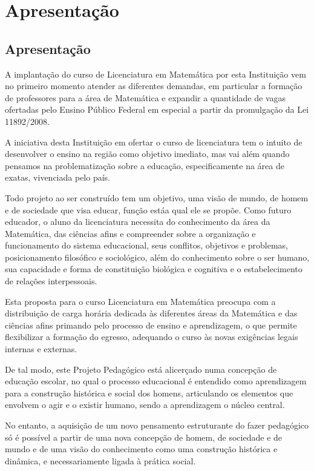 \chapter{Apresenta\c{c}\~{a}o}
\label{cap:apresentacao}

\section{Apresenta\c{c}\~{a}o}
\label{sec:apresentacao}

A implantação do curso de Licenciatura em Matemática por esta
Instituição vem no primeiro momento atender as diferentes demandas, em
particular a formação de professores para a área de Matemática e
expandir a quantidade de vagas ofertadas pelo Ensino Público Federal
em especial a partir da promulgação da Lei 11892/2008.

A iniciativa desta Instituição em ofertar o curso de licenciatura tem
o intuito de desenvolver o ensino na região como objetivo imediato,
mas vai além quando pensamos na problematização sobre a educação,
especificamente na área de exatas, vivenciada pelo país.

Todo projeto ao ser construído tem um objetivo, uma visão de mundo, de
homem e de sociedade que visa educar, função estáa qual ele se propõe.
Como futuro educador, o aluno da licenciatura necessita do
conhecimento da área da Matemática, das ciências afins e compreender
sobre a organização e funcionamento do sistema educacional, seus
conflitos, objetivos e problemas, posicionamento filosófico e
sociológico, além do conhecimento sobre o ser humano, sua capacidade e
forma de constituição biológica e cognitiva e o estabelecimento de
relações interpessoais.

Esta proposta para o curso Licenciatura em Matemática preocupa com a
distribuição de carga horária dedicada às diferentes áreas da
Matemática e das ciências afins primando pelo processo de ensino e
aprendizagem, o que permite flexibilizar a formação do egresso,
adequando o curso às novas exigências legais internas e externas.

De tal modo, este Projeto Pedagógico está alicerçado numa concepção de
educação escolar, no qual o processo educacional é entendido como
aprendizagem para a construção histórica e social dos homens,
articulando os elementos que envolvem o agir e o existir humano, sendo
a aprendizagem o núcleo central.

No entanto, a aquisição de um novo pensamento estruturante do fazer
pedagógico só é possível a partir de uma nova concepção de homem, de
sociedade e de mundo e de uma visão do conhecimento como uma
construção histórica e dinâmica, e necessariamente ligada à prática
social.

